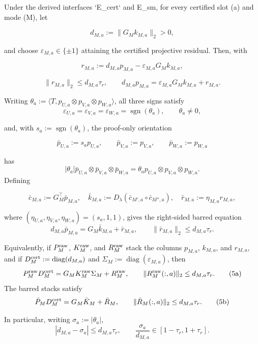 \begin{lemma}\label{lem:step-005-signed-equation}
Under the derived interfaces `E\_cert`
and E\_sm, for every certified slot (a) and mode (M), let

\[
d_{M,a}:=\|G_Mk_{M,a}\|_2>0,
\]

and choose $\varepsilon_{M,a}\in\{\pm1\}$ attaining the certified
projective residual.  Then, with

\[
r_{M,a}:=d_{M,a}p_{M,a}-\varepsilon_{M,a}G_Mk_{M,a},
\]

\[
\|r_{M,a}\|_2\le d_{M,a}\tau_r,
\qquad
d_{M,a}p_{M,a}=\varepsilon_{M,a}G_Mk_{M,a}+r_{M,a}.
\tag{2}
\]

Writing $\theta_a:=\langle T,p_{U,a}\otimes p_{V,a}\otimes p_{W,a}\rangle$,
all three signs satisfy
\[
\varepsilon_{U,a}=\varepsilon_{V,a}=\varepsilon_{W,a}
=\operatorname{sgn}(\theta_a),
\qquad \theta_a\ne0,
\tag{3}
\]

and, with $s_a:=\operatorname{sgn}(\theta_a)$, the proof-only orientation

\[
\bar p_{U,a}:=s_ap_{U,a},\qquad
\bar p_{V,a}:=p_{V,a},\qquad
\bar p_{W,a}:=p_{W,a}
\tag{4}
\]

has
\[
|\theta_a|\bar p_{U,a}\otimes\bar p_{V,a}\otimes\bar p_{W,a}
=\theta_a p_{U,a}\otimes p_{V,a}\otimes p_{W,a}.
\]
Defining

\[
\bar c_{M,a}:=G_M^\top\bar p_{M,a},\quad
\bar k_{M,a}:=D_\lambda(\bar c_{M',a}\circ\bar c_{M'',a}),\quad
\bar r_{M,a}:=\eta_{M,a}r_{M,a},
\]

where $(\eta_{U,a},\eta_{V,a},\eta_{W,a})=(s_a,1,1)$, gives the
right-sided barred equation
\[
d_{M,a}\bar p_{M,a}=G_M\bar k_{M,a}+\bar r_{M,a},
\qquad \|\bar r_{M,a}\|_2\le d_{M,a}\tau_r.
\tag{5}
\]

Equivalently, if \(P_M^{\rm raw}\), \(K_M^{\rm raw}\), and \(R_M^{\rm raw}\)
stack the columns \(p_{M,a}\), \(k_{M,a}\), and \(r_{M,a}\), and if
\(D_M^{\rm cert}:=\operatorname{diag}(d_{M,a})\) and
\(\Sigma_M:=\operatorname{diag}(\varepsilon_{M,a})\), then
\[
P_M^{\rm raw}D_M^{\rm cert}
=G_MK_M^{\rm raw}\Sigma_M+R_M^{\rm raw},\qquad
\|R_M^{\rm raw}(:,a)\|_2\le d_{M,a}\tau_r.
\tag{5a}
\]
The barred stacks satisfy
\[
\bar P_MD_M^{\rm cert}=G_M\bar K_M+\bar R_M,\qquad
\|\bar R_M(:,a)\|_2\le d_{M,a}\tau_r.
\tag{5b}
\]

In particular, writing $\sigma_a:=|\theta_a|$,
\[
|d_{M,a}-\sigma_a|\le d_{M,a}\tau_r,
\qquad
\frac{\sigma_a}{d_{M,a}}\in[1-\tau_r,1+\tau_r].
\tag{6}
\]


\end{lemma}
